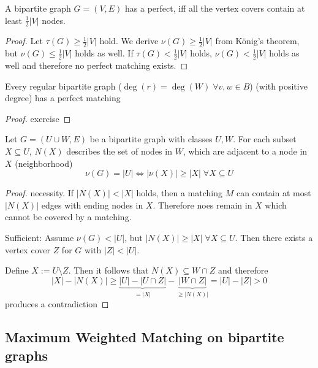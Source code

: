 \begin{lec}[2011-11-07]\end{lec}


\begin{cor}
	A bipartite graph $G=(V,E)$ has a perfect, iff all the vertex covers contain at least $\frac{1}{2} |V|$ nodes.
\end{cor}

\begin{proof}
	Let $\tau(G) \geq \frac{1}{2} |V|$ hold. We derive $\nu(G) \geq \frac{1}{2} |V|$ from König's theorem, but $\nu(G) \leq \frac{1}{2} |V|$ holds as well. If $\tau(G) < \frac{1}{2} |V|$ holds, $\nu(G) < \frac{1}{2} |V|$ holds as well and therefore no perfect matching exists.
\end{proof}

\begin{cor}
	Every regular bipartite graph ($\deg(r) = \deg(W) \; \forall v,w \in B$) (with positive degree) has a perfect matching
\end{cor}

\begin{proof}
	exercise
\end{proof}

\begin{thm}
	Let $G =( U \cup W, E)$ be a bipartite graph with classes $U, W$. For each subset $X \subseteq U$, $N(X)$ describes the set of nodes in $W$, which are adjacent to a node in $X$ (neighborhood)
	\[
		\nu(G) = |U| \Leftrightarrow | \nu(X)| \geq |X| \; \forall X \subseteq U
	\]
\end{thm}

\begin{proof}
	necessity. If $|N(X)| < |X|$ holds, then a matching $M$ can contain at most 
	$| N(X)|$ edges with ending nodes in $X$. Therefore noes remain in $X$ which 
	cannot be covered by a matching.
	
	Sufficient: Assume $\nu(G)<|U|$, but $|N(X)| \geq |X| \; \forall X \subseteq U$.
	Then there exists a vertex cover $Z$ for $G$ with $|Z| < |U|$.
	
	Define $X:=U \setminus Z$. Then it follows that $N(X) \subseteq W \cap Z$ and 
	therefore \[
		|X| - |N(X)| \geq \underbrace{|U| - |U \cap Z|}_{=|X|} - \underbrace{| W \cap Z |}_{\geq |N(X)|} = |U| - |Z| > 0
	\]
	produces a contradiction
\end{proof}

\subsection*{Maximum Weighted Matching on bipartite graphs}

